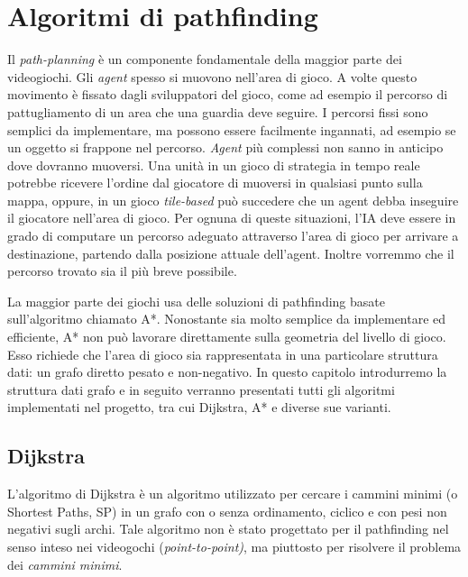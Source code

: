\documentclass[11pt]{article}
\begin{document}
\section{Algoritmi di pathfinding}
\par{Il \emph{path-planning} \`e un componente fondamentale della maggior parte dei videogiochi.
Gli \emph{agent} spesso si muovono nell'area di gioco. A volte questo movimento \`e fissato dagli sviluppatori del gioco, come ad esempio il percorso di pattugliamento di un area che una guardia deve seguire. I percorsi fissi sono semplici da implementare, ma possono essere facilmente ingannati, ad esempio se un oggetto si frappone nel percorso. \emph{Agent} pi\`u complessi non sanno in anticipo dove dovranno muoversi. Una unit\`a in un gioco di strategia in tempo reale potrebbe ricevere l'ordine dal giocatore di muoversi in qualsiasi punto sulla mappa, oppure, in un gioco \emph{tile-based} pu\`o succedere che un agent debba inseguire il giocatore nell'area di gioco.
Per ognuna di queste situazioni, l'IA deve essere in grado di computare un percorso adeguato attraverso l'area di gioco per arrivare a destinazione, partendo dalla posizione attuale dell'agent. Inoltre vorremmo che il percorso trovato sia il pi\`u breve possibile.}
\par{La maggior parte dei giochi usa delle soluzioni di pathfinding basate sull'algoritmo chiamato A*. Nonostante sia molto semplice da implementare ed efficiente, A* non pu\`o lavorare direttamente sulla geometria del livello di gioco. Esso richiede che l'area di gioco sia rappresentata in una particolare struttura dati: un grafo diretto pesato e non-negativo.
In questo capitolo introdurremo la struttura dati grafo e in seguito verranno presentati tutti gli algoritmi implementati nel progetto, tra cui Dijkstra, A* e diverse sue varianti.}

\subsection{Dijkstra}
\par{
L'algoritmo di Dijkstra \`e un algoritmo utilizzato per cercare i cammini minimi (o Shortest Paths, SP) in un grafo con o senza ordinamento, ciclico e con pesi non negativi sugli archi.
Tale algoritmo non \`e stato progettato per il pathfinding nel senso inteso nei videogochi (\emph{point-to-point)}, ma piuttosto per risolvere il problema dei \emph{cammini minimi}.}
\end{document}
